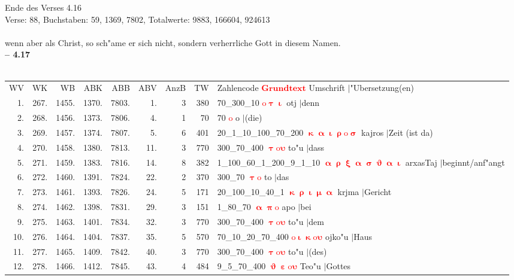 \documentclass[a4paper,10pt,landscape]{article}
\begin{document}
Ende des Verses 4.16\\
Verse: 88, Buchstaben: 59, 1369, 7802, Totalwerte: 9883, 166604, 924613\\
\\
wenn aber als Christ, so sch"ame er sich nicht, sondern verherrliche Gott in diesem Namen.\\
\newpage 
{\bf -- 4.17}\\
\medskip \\
\begin{tabular}{rrrrrrrrp{120mm}}
WV&WK&WB&ABK&ABB&ABV&AnzB&TW&Zahlencode \textcolor{red}{$\boldsymbol{Grundtext}$} Umschrift $|$"Ubersetzung(en)\\
1.&267.&1455.&1370.&7803.&1.&3&380&70\_300\_10 \textcolor{red}{$\boldsymbol{\mathrm{o}\uptau\upiota}$} otj $|$denn\\
2.&268.&1456.&1373.&7806.&4.&1&70&70 \textcolor{red}{$\boldsymbol{\mathrm{o}}$} o $|$(die)\\
3.&269.&1457.&1374.&7807.&5.&6&401&20\_1\_10\_100\_70\_200 \textcolor{red}{$\boldsymbol{\upkappa\upalpha\upiota\uprho\mathrm{o}\upsigma}$} kajros $|$Zeit (ist da)\\
4.&270.&1458.&1380.&7813.&11.&3&770&300\_70\_400 \textcolor{red}{$\boldsymbol{\uptau\mathrm{o}\upsilon}$} to"u $|$dass\\
5.&271.&1459.&1383.&7816.&14.&8&382&1\_100\_60\_1\_200\_9\_1\_10 \textcolor{red}{$\boldsymbol{\upalpha\uprho\upxi\upalpha\upsigma\upvartheta\upalpha\upiota}$} arxasTaj $|$beginnt/anf"angt\\
6.&272.&1460.&1391.&7824.&22.&2&370&300\_70 \textcolor{red}{$\boldsymbol{\uptau\mathrm{o}}$} to $|$das\\
7.&273.&1461.&1393.&7826.&24.&5&171&20\_100\_10\_40\_1 \textcolor{red}{$\boldsymbol{\upkappa\uprho\upiota\upmu\upalpha}$} krjma $|$Gericht\\
8.&274.&1462.&1398.&7831.&29.&3&151&1\_80\_70 \textcolor{red}{$\boldsymbol{\upalpha\uppi\mathrm{o}}$} apo $|$bei\\
9.&275.&1463.&1401.&7834.&32.&3&770&300\_70\_400 \textcolor{red}{$\boldsymbol{\uptau\mathrm{o}\upsilon}$} to"u $|$dem\\
10.&276.&1464.&1404.&7837.&35.&5&570&70\_10\_20\_70\_400 \textcolor{red}{$\boldsymbol{\mathrm{o}\upiota\upkappa\mathrm{o}\upsilon}$} ojko"u $|$Haus\\
11.&277.&1465.&1409.&7842.&40.&3&770&300\_70\_400 \textcolor{red}{$\boldsymbol{\uptau\mathrm{o}\upsilon}$} to"u $|$(des)\\
12.&278.&1466.&1412.&7845.&43.&4&484&9\_5\_70\_400 \textcolor{red}{$\boldsymbol{\upvartheta\upepsilon\mathrm{o}\upsilon}$} Teo"u $|$Gottes\\

\end{tabular}
\end{document}
